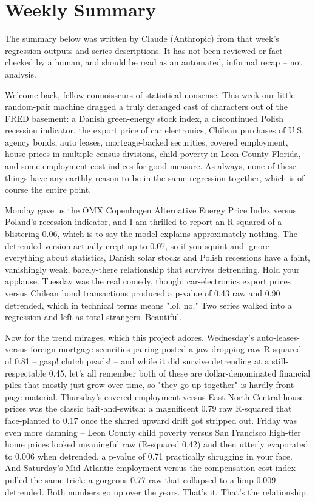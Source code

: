 \section{Weekly Summary}

\begin{tcolorbox}[colback=yellow!10,colframe=black!50,title=AI-Generated Content]
\noindent The summary below was written by Claude (Anthropic) from that week's regression outputs and series descriptions. It has not been reviewed or fact-checked by a human, and should be read as an automated, informal recap -- not analysis.
\end{tcolorbox}

Welcome back, fellow connoisseurs of statistical nonsense. This week our little random-pair machine dragged a truly deranged cast of characters out of the FRED basement: a Danish green-energy stock index, a discontinued Polish recession indicator, the export price of car electronics, Chilean purchases of U.S. agency bonds, auto leases, mortgage-backed securities, covered employment, house prices in multiple census divisions, child poverty in Leon County Florida, and some employment cost indices for good measure. As always, none of these things have any earthly reason to be in the same regression together, which is of course the entire point.

Monday gave us the OMX Copenhagen Alternative Energy Price Index versus Poland's recession indicator, and I am thrilled to report an R-squared of a blistering 0.06, which is to say the model explains approximately nothing. The detrended version actually crept up to 0.07, so if you squint and ignore everything about statistics, Danish solar stocks and Polish recessions have a faint, vanishingly weak, barely-there relationship that survives detrending. Hold your applause. Tuesday was the real comedy, though: car-electronics export prices versus Chilean bond transactions produced a p-value of 0.43 raw and 0.90 detrended, which in technical terms means "lol, no." Two series walked into a regression and left as total strangers. Beautiful.

Now for the trend mirages, which this project adores. Wednesday's auto-leases-versus-foreign-mortgage-securities pairing posted a jaw-dropping raw R-squared of 0.81 -- gasp! clutch pearls! -- and while it did survive detrending at a still-respectable 0.45, let's all remember both of these are dollar-denominated financial piles that mostly just grow over time, so "they go up together" is hardly front-page material. Thursday's covered employment versus East North Central house prices was the classic bait-and-switch: a magnificent 0.79 raw R-squared that face-planted to 0.17 once the shared upward drift got stripped out. Friday was even more damning -- Leon County child poverty versus San Francisco high-tier home prices looked meaningful raw (R-squared 0.42) and then utterly evaporated to 0.006 when detrended, a p-value of 0.71 practically shrugging in your face. And Saturday's Mid-Atlantic employment versus the compensation cost index pulled the same trick: a gorgeous 0.77 raw that collapsed to a limp 0.009 detrended. Both numbers go up over the years. That's it. That's the relationship.

